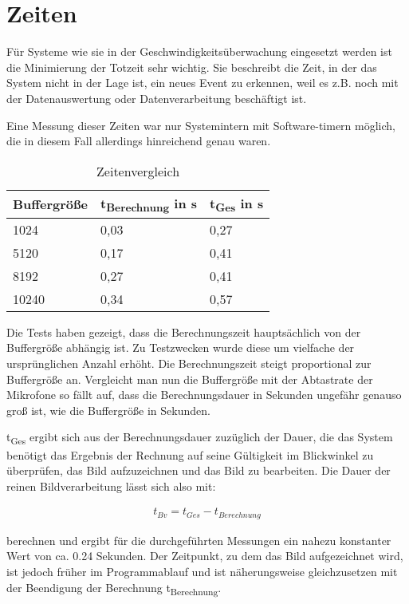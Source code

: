 \section{Zeiten}

Für Systeme wie sie in der Geschwindigkeitsüberwachung eingesetzt werden ist die Minimierung der Totzeit sehr wichtig. Sie beschreibt die Zeit, in der das System nicht in der Lage ist, ein neues Event zu erkennen, weil es z.B. noch mit der Datenauswertung oder Datenverarbeitung beschäftigt ist.

Eine Messung dieser Zeiten war nur Systemintern mit Software-timern möglich, die in diesem Fall allerdings hinreichend genau waren.

\begin{table}[h]
\centering
\begin{tabular}[h]{|l|l|l|}
	\hline
	Buffergröße & t\textsubscript{Berechnung} in s & t\textsubscript{Ges} in s \\
	\hline
	1024 & 0,03 & 0,27\\
	\hline
	5120 & 0,17 & 0,41\\
	\hline
	8192 & 0,27 & 0,41\\
	\hline
	10240 & 0,34 & 0,57\\
	\hline	
\end{tabular}
\caption{Zeitenvergleich}
\label{tab:Zeitenvergleich}
\end{table}

Die Tests haben gezeigt, dass die Berechnungszeit hauptsächlich von der Buffergröße abhängig ist. Zu Testzwecken wurde diese um vielfache der ursprünglichen Anzahl erhöht. Die Berechnungszeit steigt proportional zur Buffergröße an. Vergleicht man nun die Buffergröße mit der Abtastrate der Mikrofone so fällt auf, dass die Berechnungsdauer in Sekunden ungefähr genauso groß ist, wie die Buffergröße in Sekunden. 

t\textsubscript{Ges} ergibt sich aus der Berechnungsdauer zuzüglich der Dauer, die das System benötigt das Ergebnis der Rechnung auf seine Gültigkeit im Blickwinkel zu überprüfen, das Bild aufzuzeichnen und das Bild zu bearbeiten. Die Dauer der reinen Bildverarbeitung lässt sich also mit:

\begin{equation}
	\begin{aligned}
		t_{Bv} = t_{Ges} - t_{Berechnung}
	\end{aligned}
	\nonumber
\end{equation}

berechnen und ergibt für die durchgeführten Messungen ein nahezu konstanter Wert von ca. 0.24 Sekunden. Der Zeitpunkt, zu dem das Bild aufgezeichnet wird, ist jedoch früher im Programmablauf und ist näherungsweise gleichzusetzen mit der Beendigung der Berechnung t\textsubscript{Berechnung}. 

\newpage